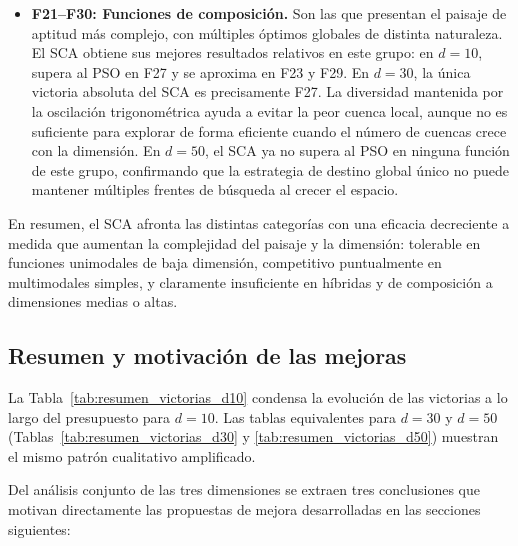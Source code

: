 \documentclass[12pt,a4paper]{article}
\begin{document}
\begin{itemize}
    \item \textbf{F21--F30: Funciones de composición.} Son las que presentan el paisaje de aptitud más complejo, con múltiples óptimos globales de distinta naturaleza. El SCA obtiene sus mejores resultados relativos en este grupo: en $d=10$, supera al PSO en F27 y se aproxima en F23 y F29. En $d=30$, la única victoria absoluta del SCA es precisamente F27. La diversidad mantenida por la oscilación trigonométrica ayuda a evitar la peor cuenca local, aunque no es suficiente para explorar de forma eficiente cuando el número de cuencas crece con la dimensión. En $d=50$, el SCA ya no supera al PSO en ninguna función de este grupo, confirmando que la estrategia de destino global único no puede mantener múltiples frentes de búsqueda al crecer el espacio.
\end{itemize}

En resumen, el SCA afronta las distintas categorías con una eficacia decreciente a medida que aumentan la complejidad del paisaje y la dimensión: tolerable en funciones unimodales de baja dimensión, competitivo puntualmente en multimodales simples, y claramente insuficiente en híbridas y de composición a dimensiones medias o altas.

\subsection{Resumen y motivación de las mejoras}
\label{sec:resumen_motivacion}

La Tabla~\ref{tab:resumen_victorias_d10} condensa la evolución de las victorias a lo largo del presupuesto para $d=10$. Las tablas equivalentes para $d=30$ y $d=50$ (Tablas~\ref{tab:resumen_victorias_d30} y \ref{tab:resumen_victorias_d50}) muestran el mismo patrón cualitativo amplificado.

Del análisis conjunto de las tres dimensiones se extraen tres conclusiones que motivan directamente las propuestas de mejora desarrolladas en las secciones siguientes:
\end{document}
